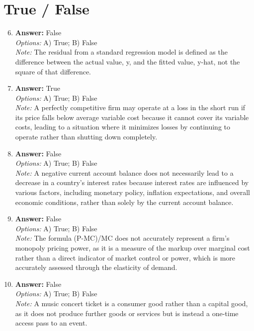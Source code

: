 \documentclass[12pt]{article}
\begin{document}
\section*{True / False}
\begin{enumerate}[label=\arabic*.]
\setcounter{enumi}{5}
\item \textbf{Answer:} False
\\ \textit{Options:} A) True; B) False
\\ \textit{Note:} The residual from a standard regression model is defined as the difference between the actual value, y, and the fitted value, y-hat, not the square of that difference.
\item \textbf{Answer:} True
\\ \textit{Options:} A) True; B) False
\\ \textit{Note:} A perfectly competitive firm may operate at a loss in the short run if its price falls below average variable cost because it cannot cover its variable costs, leading to a situation where it minimizes losses by continuing to operate rather than shutting down completely.
\item \textbf{Answer:} False
\\ \textit{Options:} A) True; B) False
\\ \textit{Note:} A negative current account balance does not necessarily lead to a decrease in a country's interest rates because interest rates are influenced by various factors, including monetary policy, inflation expectations, and overall economic conditions, rather than solely by the current account balance.
\item \textbf{Answer:} False
\\ \textit{Options:} A) True; B) False
\\ \textit{Note:} The formula (P-MC)/MC does not accurately represent a firm's monopoly pricing power, as it is a measure of the markup over marginal cost rather than a direct indicator of market control or power, which is more accurately assessed through the elasticity of demand.
\item \textbf{Answer:} False
\\ \textit{Options:} A) True; B) False
\\ \textit{Note:} A music concert ticket is a consumer good rather than a capital good, as it does not produce further goods or services but is instead a one-time access pass to an event.
\end{enumerate}
\end{document}
